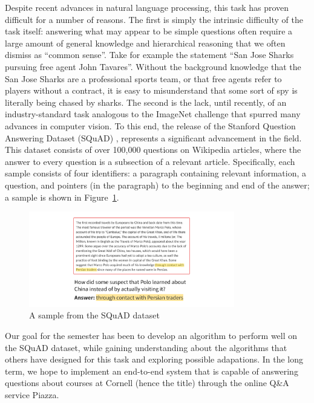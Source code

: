 \documentclass{article}
\begin{document}
Despite recent advances in natural language processing, this task has proven difficult for a number of reasons. The first is simply the intrinsic difficulty of the task itself: answering what may appear to be simple questions often require a large amount of general knowledge and hierarchical reasoning that we often dismiss as ``common sense''. Take for example the statement ``San Jose Sharks pursuing free agent John Tavares''. Without the background knowledge that the San Jose Sharks are a professional sports team, or that free agents refer to players without a contract, it is easy to misunderstand that some sort of spy is literally being chased by sharks. The second is the lack, until recently, of an industry-standard task analogous to the ImageNet challenge that spurred many advances in computer vision. To this end, the release of the Stanford Question Answering Dataset (SQuAD) \cite{SQuAD}, represents a significant advancement in the field. This dataset consists of over 100,000 questions on Wikipedia articles, where the answer to every question is a subsection of a relevant article. Specifically, each sample consists of four identifiers: a paragraph containing relevant information, a question, and pointers (in the paragraph) to the beginning and end of the answer; a sample is shown in Figure~\ref{fig:squadExample}.

\begin{figure}[h]
	\includegraphics[width=0.8\textwidth]{squad_example.png}
	\centering
	\caption{A sample from the SQuAD dataset}
	\label{fig:squadExample}
\end{figure}

Our goal for the semester has been to develop an algorithm to perform well on the SQuAD dataset, while gaining understanding about the algorithms that others have designed for this task and exploring possible adapations. In the long term, we hope to implement an end-to-end system that is capable of answering questions about courses at Cornell (hence the title) through the online Q\&A service Piazza. 
\end{document}
